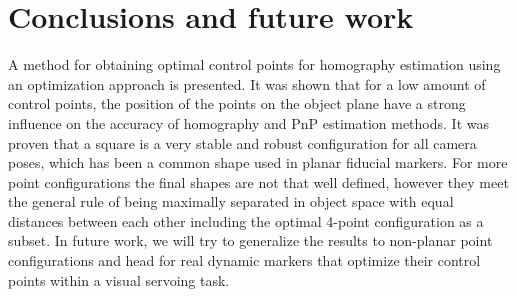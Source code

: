 \documentclass[letterpaper, 10 pt, conference]{ieeeconf}  %
\begin{document}
	
	
	\section{Conclusions and future work}
	\label{Conc}
	A method for obtaining optimal control points for homography estimation using an optimization approach is presented. It was shown that for a low amount of control points, the position of the points on the object plane have a strong influence on the accuracy of homography and PnP estimation methods. 
	It was proven that a square is a very stable and robust configuration for all camera poses, which has been a common shape used in planar fiducial markers. For more point configurations the final shapes are not that well defined, however they meet the general rule of being maximally separated in object space with equal distances between each other including the optimal 4-point configuration as a subset. In future work, we will try to generalize the results to non-planar point configurations and head for real dynamic markers that optimize their control points within a visual servoing task. %
	
	
	
	
	
	
	
	
	
	{\small
		
		
		
		
	}
\end{document}
